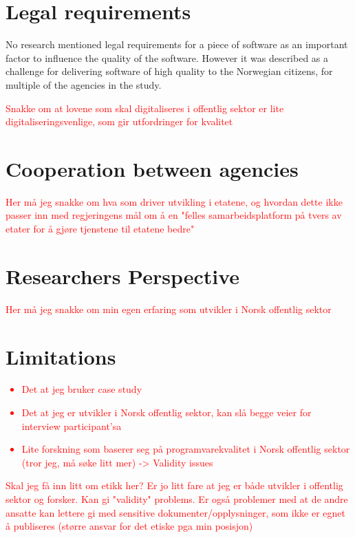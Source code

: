 \section{Legal requirements}
No research mentioned legal requirements for a piece of software as an important factor to influence the quality of the software. However it was described as a challenge for delivering software of high quality to the Norwegian citizens, for multiple of the agencies in the study.

\textcolor{red}{Snakke om at lovene som skal digitaliseres i offentlig sektor er lite digitaliseringsvenlige, som gir utfordringer for kvalitet}

\section{Cooperation between agencies}
\textcolor{red}{Her må jeg snakke om hva som driver utvikling i etatene, og hvordan dette ikke passer inn med regjeringens mål om å en "felles samarbeidsplatform på tvers av etater for å gjøre tjenstene til etatene bedre"}

\section{Researchers Perspective}
\textcolor{red}{Her må jeg snakke om min egen erfaring som utvikler i Norsk offentlig sektor}

\section{Limitations}
\textcolor{red}{\begin{itemize}
    \item Det at jeg bruker case study
    \item Det at jeg er utvikler i Norsk offentlig sektor, kan slå begge veier for interview participant'sa
    \item Lite forskning som baserer seg på programvarekvalitet i Norsk offentlig sektor (tror jeg, må søke litt mer) -> Validity issues
\end{itemize}}

\textcolor{red}{Skal jeg få inn litt om etikk her? Er jo litt fare at jeg er både utvikler i offentlig sektor og forsker. Kan gi "validity" problems. Er også problemer med at de andre ansatte kan lettere gi med sensitive dokumenter/opplysninger, som ikke er egnet å publiseres (større ansvar for det etiske pga min posisjon)}
